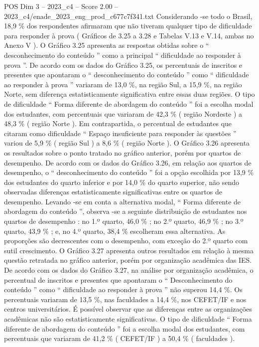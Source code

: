 \begin{textsample}{POS Dim 3 – 2023\_c4 – Score 2.00 – 2023\_c4/enade\_2023\_eng\_prod\_c677c7f341.txt}
Considerando -se todo o Brasil, 18,9 \% dos respondentes afirmaram que não tiveram qualquer tipo de dificuldade para responder à prova ( Gráficos de 3.25 a 3.28 e Tabelas V.13 e V.14, ambas no Anexo V ).
O Gráfico 3.25 apresenta as respostas obtidas sobre o “ desconhecimento do conteúdo ” como a principal “ dificuldade ao responder à prova ”.
De acordo com os dados do Gráfico 3.25, os percentuais de inscritos e presentes que apontaram o “ desconhecimento do conteúdo ” como “ dificuldade ao responder à prova ” variaram de 13,0 \%, na região Sul, a 15,9 \%, na região Norte, sem diferença estatisticamente significativa entre essas duas regiões.
O tipo de dificuldade “ Forma diferente de abordagem do conteúdo ” foi a escolha modal dos estudantes, com percentuais que variaram de 42,3 \% ( região Nordeste ) a 48,3 \% ( região Norte ).
Em contrapartida, o percentual de estudantes que citaram como dificuldade “ Espaço insuficiente para responder às questões ” variou de 5,9 \% ( região Sul ) a 8,6 \% ( região Norte ).
O Gráfico 3.26 apresenta os resultados sobre o ponto tratado no gráfico anterior, porém por quartos de desempenho.
De acordo com os dados do Gráfico 3.26, em relação aos quartos de desempenho, o “ desconhecimento do conteúdo ” foi a opção escolhida por 13,9 \% dos estudantes do quarto inferior e por 14,0 \% do quarto superior, não sendo observadas diferenças estatisticamente significativas entre os quartos de desempenho.
Levando -se em conta a alternativa modal, “ Forma diferente de abordagem do conteúdo ”, observa -se a seguinte distribuição de estudantes nos quartos de desempenho : no 1.º quarto, 46,0 \% ; no 2.º quarto, 46,9 \% ; no 3.º quarto, 43,9 \% ; e, no 4.º quarto, 38,4 \% escolheram essa alternativa.
As proporções são decrescentes com o desempenho, com exceção do 2.º quarto com sutil crescimento.
O Gráfico 3.27 apresenta outros resultados em relação à mesma questão retratada no gráfico anterior, porém por organização acadêmica das IES.
De acordo com os dados do Gráfico 3.27, na análise por organização acadêmica, o percentual de inscritos e presentes que apontaram o “ Desconhecimento do conteúdo ” como “ dificuldade ao responder à prova ” não superou 14,4 \%.
Os percentuais variaram de 13,5 \%, nas faculdades a 14,4 \%, nos CEFET/IF e nos centros universitários.
É possível observar que as diferenças entre as organizações acadêmicas não são estatisticamente significativas.
O tipo de dificuldade “ Forma diferente de abordagem do conteúdo ” foi a escolha modal dos estudantes, com percentuais que variaram de 41,2 \% ( CEFET/IF ) a 50,4 \% ( faculdades ).

\end{textsample}
